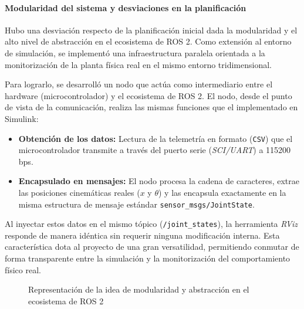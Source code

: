 \documentclass[11pt,fleqn]{book} %
\begin{document}
\newpage
\paragraph{Modularidad del sistema y desviaciones en la planificación}

Hubo una desviación respecto de la planificación inicial dada la modularidad y el alto nivel de abstracción en el ecosistema de ROS 2. Como extensión al entorno de simulación, se implementó una infraestructura paralela orientada a la monitorización de la planta física real en el mismo entorno tridimensional. 

Para lograrlo, se desarrolló un nodo que actúa como intermediario entre el hardware (microcontrolador) y el ecosistema de ROS 2. El nodo, desde el punto de vista de la comunicación, realiza las mismas funciones que el implementado en Simulink:
\begin{itemize}[]
	\item \textbf{Obtención de los datos:} Lectura de la telemetría en formato (\texttt{CSV}) que el microcontrolador transmite a través del puerto serie (\textit{SCI/UART}) a 115200 bps.
	
	\item \textbf{Encapsulado en mensajes:} El nodo procesa la cadena de caracteres, extrae las posiciones cinemáticas reales ($x$ y $\theta$) y las encapsula exactamente en la misma estructura de mensaje estándar \texttt{sensor\_msgs/JointState}.
	
\end{itemize}

Al inyectar estos datos en el mismo tópico (\texttt{/joint\_states}), la herramienta \textit{RViz} responde de manera idéntica sin requerir ninguna modificación interna. Esta característica dota al proyecto de una gran versatilidad, permitiendo conmutar de forma transparente entre la simulación y la monitorización del comportamiento físico real.
\begin{figure}[ht]
	\centering
	\resizebox{\textwidth}{!}{%
	}
	\caption{Representación de la idea de modularidad y abstracción en el ecosistema de ROS 2}
	\label{fig:modularidad_ros}
\end{figure}

\FloatBarrier
\end{document}
